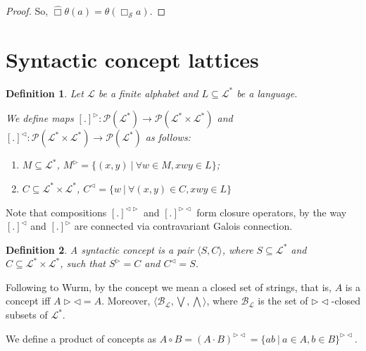 \documentclass[a4paper]{article}
\theoremstyle{defin}
\newtheorem{defin}{Definition}
\theoremstyle{theorem}
\theoremstyle{prop}
\theoremstyle{lemma}
\theoremstyle{ex}
\theoremstyle{col}
\begin{document}
\begin{proof}
So, $\hat{\Box} \theta(a) = \theta(\Box_{\mathcal{S}} a)$.

\end{proof}

\section{Syntactic concept lattices}

\begin{defin}
  Let $\mathcal{L}$ be a finite alphabet and $L \subseteq \mathcal{L}^{*}$ be a language.

  We define maps $[.]^{\triangleright} : \mathcal{P}(\mathcal{L}^{*}) \to \mathcal{P}(\mathcal{L}^{*} \times \mathcal{L}^{*})$
  and $[.]^{\triangleleft} : \mathcal{P}(\mathcal{L}^{*} \times \mathcal{L}^{*}) \to \mathcal{P}(\mathcal{L}^{*})$ as follows:

  \begin{enumerate}
    \item $M \subseteq \mathcal{L}^{*}$, $M^{\triangleright} = \{ (x, y) \: | \: \forall w \in M, x w y \in L \}$;
    \item $C \subseteq \mathcal{L}^{*} \times \mathcal{L}^{*}$, $C^{\triangleleft} = \{ w \: | \: \forall (x, y) \in C, x w y
    \in L\}$
  \end{enumerate}
\end{defin}

Note that compositions $[.]^{\triangleleft \triangleright}$ and $[.]^{\triangleright \triangleleft}$ form closure operators,
by the way $[.]^{\triangleleft}$ and $[.]^{\triangleright}$ are connected via contravariant Galois connection.

\begin{defin} A syntactic concept is a pair $\langle S, C \rangle$, where $S \subseteq \mathcal{L}^{*}$
  and $C \subseteq \mathcal{L}^{*} \times \mathcal{L}^{*}$, such that $S^{\triangleright} = C$ and $C^{\triangleleft} = S$.
\end{defin}

Following to Wurm, by the concept we mean a closed set of strings, that is, $A$ is a concept iff $A \triangleright
\triangleleft = A$. Moreover, $\langle \mathcal{B}_{\mathcal{L}}, \bigvee, \bigwedge \rangle$, where
$\mathcal{B}_{\mathcal{L}}$ is the set of $\triangleright \triangleleft$-closed subsets of $\mathcal{L}^{*}$.

We define a product of concepts as $A \circ B = (A \cdot B)^{\triangleright \triangleleft} =
\{ a b \: | \: a \in A, b \in B \}^{\triangleright \triangleleft}$.
\end{document}
